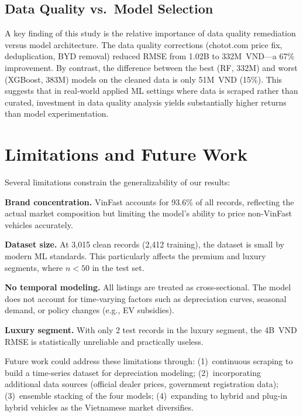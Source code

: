 \documentclass[lettersize,journal]{IEEEtran}
\begin{document}
\subsection{Data Quality vs.\ Model Selection}
A key finding of this study is the relative importance of data quality
remediation versus model architecture. The data quality corrections (chotot.com
price fix, deduplication, BYD removal) reduced RMSE from 1.02B to 332M~VND---a
67\% improvement. By contrast, the difference between the best (RF, 332M) and
worst (XGBoost, 383M) models on the cleaned data is only 51M~VND (15\%). This
suggests that in real-world applied ML settings where data is scraped rather
than curated, investment in data quality analysis yields substantially higher
returns than model experimentation.

\section{Limitations and Future Work}

Several limitations constrain the generalizability of our results:

\textbf{Brand concentration.} VinFast accounts for 93.6\% of all records,
reflecting the actual market composition but limiting the model's ability to
price non-VinFast vehicles accurately.

\textbf{Dataset size.} At 3,015 clean records (2,412 training), the dataset
is small by modern ML standards. This particularly affects the premium and
luxury segments, where $n < 50$ in the test set.

\textbf{No temporal modeling.} All listings are treated as cross-sectional.
The model does not account for time-varying factors such as depreciation
curves, seasonal demand, or policy changes (e.g., EV subsidies).

\textbf{Luxury segment.} With only 2 test records in the luxury segment, the
4B~VND RMSE is statistically unreliable and practically useless.

Future work could address these limitations through: (1)~continuous scraping
to build a time-series dataset for depreciation modeling; (2)~incorporating
additional data sources (official dealer prices, government registration
data); (3)~ensemble stacking of the four models; (4)~expanding to hybrid and
plug-in hybrid vehicles as the Vietnamese market diversifies.

\end{document}
